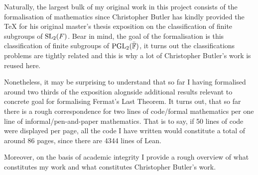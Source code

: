 Naturally, the largest bulk of my original work in this project consists of the formalisation of mathematics since Christopher Butler has kindly provided the TeX for his original master's thesis exposition on
the classification of finite subgroups of $\operatorname{SL}_2(F)$. Bear in mind, the goal of the formalisation is this classification of finite subgroups of $\operatorname{PGL}_2(\bar{\mathbb{F}})$, it turns out the classifications problems are tightly
related and this is why a lot of Christopher Butler's work is reused here.

Nonetheless, it may be surprising to understand that so far I having formalised around two thirds of the exposition alognside additional results relevant to concrete goal for formalising Fermat's Last Theorem.
It turns out, that so far there is a rough correspondence for two lines of code/formal mathematics per one line of informal/pen-and-paper mathematics. That is to say, if 50 lines of code were displayed per page, all
the code I have written would constitute a total of around 86 pages, since there are 4344 lines of Lean.

Moreover, on the basis of academic integrity I provide a rough overview of what constitutes my work and what constitutes Christopher Butler's work.

